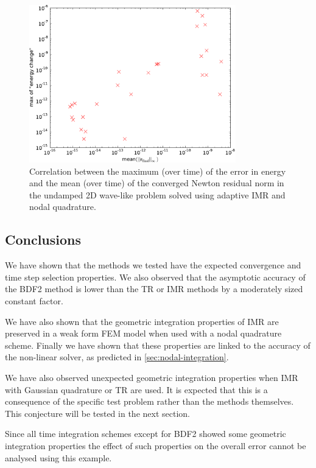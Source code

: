 \begin{figure}
  \centering
  \includegraphics[width=0.8\textwidth]
  {plots/2d_wave_solution_energy_newton_res/maxofenergychangevsmeanminofnewtonresiduals.pdf}
  \caption{Correlation between the maximum (over time) of the error in energy and the mean (over time) of the converged Newton residual norm in the undamped 2D wave-like problem solved using adaptive IMR and nodal quadrature.
  }
  \label{fig:energy-error-2d-nodal-newton-tests}
\end{figure}



\subsection{Conclusions}

We have shown that the methods we tested have the expected convergence and time step selection properties.
We also observed that the asymptotic accuracy of the BDF2 method is lower than the TR or IMR methods by a moderately sized constant factor.

We have also shown that the geometric integration properties of IMR are preserved in a weak form FEM model when used with a nodal quadrature scheme.
Finally we have shown that these properties are linked to the accuracy of the non-linear solver, as predicted in \cref{sec:nodal-integration}.

We have also observed unexpected geometric integration properties when IMR with Gaussian quadrature or TR are used.
It is expected that this is a consequence of the specific test problem rather than the methods themselves.
This conjecture will be tested in the next section.

Since all time integration schemes except for BDF2 showed some geometric integration properties the effect of such properties on the overall error cannot be analysed using this example.


